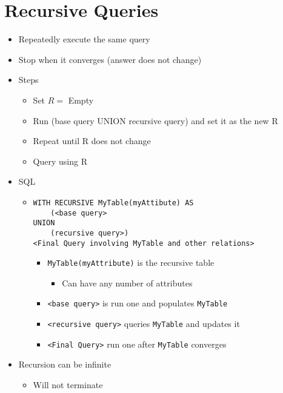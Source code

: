 
\section{Recursive Queries}
\begin{itemize}
    \item Repeatedly execute the same query
    \item Stop when it converges (answer does not change)
    \item Steps
        \begin{itemize}
            \item Set $R =$ Empty
            \item Run (base query UNION recursive query) and set it as the new R
            \item Repeat until R does not change
            \item Query using R
        \end{itemize}
    \item SQL
        \begin{itemize}
            \item
\begin{verbatim}
WITH RECURSIVE MyTable(myAttibute) AS
    (<base query>
UNION
    (recursive query>)
<Final Query involving MyTable and other relations>
\end{verbatim}
                \begin{itemize}
                    \item \verb+MyTable(myAttribute)+ is the recursive table
                        \begin{itemize}
                            \item Can have any number of attributes
                        \end{itemize}
                    \item \verb+<base query>+ is run one and populates \verb+MyTable+
                    \item \verb+<recursive query>+ queries \verb+MyTable+ and updates it
                    \item \verb+<Final Query>+ run one after \verb+MyTable+ converges
                \end{itemize}
        \end{itemize}
    \item Recursion can be infinite
        \begin{itemize}
            \item Will not terminate

\end{itemize}
\end{itemize}

